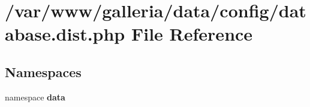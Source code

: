 \section{/var/www/galleria/data/config/database.dist.php File Reference}
\label{database_8dist_8php}
\subsection*{Namespaces}
\begin{CompactItemize}
\item 
namespace {\bf data}
\end{CompactItemize}
